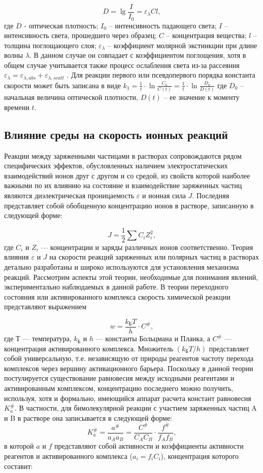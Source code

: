 \documentclass[a4paper, 12pt]{article}
\begin{document}
\[D=\lg{\frac{I}{I_0}}=\varepsilon_\lambda Cl,\]
где $D$ - оптическая плотность; $I_0$ – интенсивность падающего света; $I$ – интенсивность
света, прошедшего через образец; $C$ – концентрация вещества; $l$ – толщина
поглощающего слоя; $\varepsilon_\lambda$ – коэффициент молярной экстинкции при длине волны $\lambda$. В
данном случае он совпадает с коэффициентом поглощения, хотя в общем случае
учитывается также процесс ослабления света из-за рассеяния $\varepsilon_\lambda = \varepsilon_{\lambda,abs} + \varepsilon_{\lambda,scatt}$ .
Для реакции первого или псевдопервого порядка константа скорости может быть
записана в виде $k_1=\frac{1}{t}\cdot\ln{\frac{C_0}{C(t)}}=\frac{1}{t}\cdot\ln{\frac{D_0}{D(t)}}$
где $D_0$ – начальная величина оптической
плотности, $D(t)$ – ее значение к моменту времени $t$.

	\subsection*{Влияние среды на скорость ионных реакций}
	Реакции между заряженными частицами в растворах сопровождаются рядом
специфических эффектов, обусловленных наличием электростатических взаимодействий ионов друг с другом и со средой, из свойств которой наиболее важными по
их влиянию на состояние и взаимодействие заряженных частиц являются диэлектрическая проницаемость $\varepsilon$ и ионная сила $J$. Последняя представляет собой обобщенную
концентрацию ионов в растворе, записанную в следующей форме:

\[J= \frac{1}{2} \sum{C_i Z_i^2},\]
где $C_i$ и $Z_i$ — концентрации и заряды различных ионов соответственно.
Теория влияния $\varepsilon$ и $J$ на скорости реакций заряженных или полярных частиц в
растворах детально разработаны и широко используются для установления механизма
реакций. Рассмотрим аспекты этой теории, необходимые для понимания явлений,
экспериментально наблюдаемых в данной работе.
В теории переходного состояния или активированного комплекса скорость
химической реакции представляют выражением

 \[w = \frac{k_\text{Б}T}{h}\cdot C^\#,\]
где $Т$ — температура, $k_\text{Б}$ и $h$ — константы Больцмана и Планка, а $C^\#$ — концентрация активированного комплекса. Множитель $(k_\text{Б}T / h)$ представляет собой универсальную, т.е. независящую от природы реагентов частоту перехода комплексов через вершину
активационного барьера.
Поскольку в данной теории постулируется существование равновесия между
исходными реагентами и активированным комплексом, концентрацию последнего
можно получить, используя, хотя и формально, имеющийся аппарат расчета констант
равновесия $K_a^\#$. В частности, для бимолекулярной реакции с участием заряженных частиц A и B в растворе она записывается в следующей форме:
\[K_a^\#=\frac{a^\#}{a_Aa_B}=\frac{C^\#}{C_AC_B}\cdot\frac{f^\#}{f_Af_B},\]
в которой $a$ и $f$ представляют собой активности и коэффициенты активности реагентов
и активированного комплекса ($a_i = f_i C_i$), концентрация которого составит:
\end{document}
